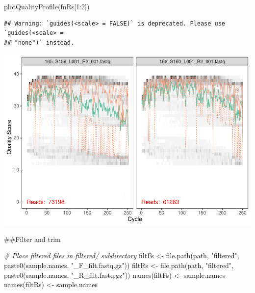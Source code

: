 \documentclass[
]{article}
\newenvironment{Shaded}{\begin{snugshade}}{\end{snugshade}}
\newcommand{\CommentTok}[1]{\textcolor[rgb]{0.56,0.35,0.01}{\textit{#1}}}
\newcommand{\DecValTok}[1]{\textcolor[rgb]{0.00,0.00,0.81}{#1}}
\newcommand{\FunctionTok}[1]{\textcolor[rgb]{0.00,0.00,0.00}{#1}}
\newcommand{\NormalTok}[1]{#1}
\newcommand{\OtherTok}[1]{\textcolor[rgb]{0.56,0.35,0.01}{#1}}
\newcommand{\SpecialCharTok}[1]{\textcolor[rgb]{0.00,0.00,0.00}{#1}}
\newcommand{\StringTok}[1]{\textcolor[rgb]{0.31,0.60,0.02}{#1}}
\begin{document}
\begin{Shaded}
\begin{Highlighting}[]
\FunctionTok{plotQualityProfile}\NormalTok{(fnRs[}\DecValTok{1}\SpecialCharTok{:}\DecValTok{2}\NormalTok{])}
\end{Highlighting}
\end{Shaded}

\begin{verbatim}
## Warning: `guides(<scale> = FALSE)` is deprecated. Please use `guides(<scale> =
## "none")` instead.
\end{verbatim}

\includegraphics{BlackGillShrimpDADA2_files/figure-latex/unnamed-chunk-3-1.pdf}

\#\#Filter and trim

\begin{Shaded}
\begin{Highlighting}[]
\CommentTok{\# Place filtered files in filtered/ subdirectory}
\NormalTok{filtFs }\OtherTok{\textless{}{-}} \FunctionTok{file.path}\NormalTok{(path, }\StringTok{"filtered"}\NormalTok{, }\FunctionTok{paste0}\NormalTok{(sample.names, }\StringTok{"\_F\_filt.fastq.gz"}\NormalTok{))}
\NormalTok{filtRs }\OtherTok{\textless{}{-}} \FunctionTok{file.path}\NormalTok{(path, }\StringTok{"filtered"}\NormalTok{, }\FunctionTok{paste0}\NormalTok{(sample.names, }\StringTok{"\_R\_filt.fastq.gz"}\NormalTok{))}
\FunctionTok{names}\NormalTok{(filtFs) }\OtherTok{\textless{}{-}}\NormalTok{ sample.names}
\FunctionTok{names}\NormalTok{(filtRs) }\OtherTok{\textless{}{-}}\NormalTok{ sample.names}
\end{Highlighting}
\end{Shaded}
\end{document}
